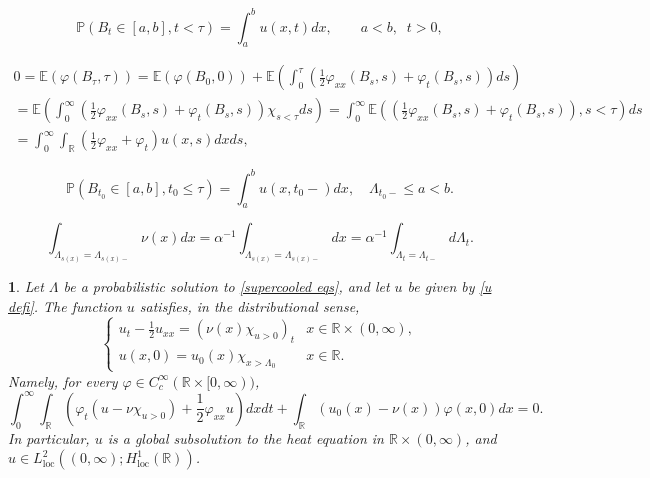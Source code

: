 \documentclass[10pt,a4paper]{amsart}
\newtheorem{prop}{}
\def\E{{\mathbb{E}}}
\def\P{{\mathbb{P}}}
\def\R{{\mathbb{R}}}
\begin{document}
\begin{equation} \label{u defi}    \P(B_t\in [a,b], t<\tau)=\int_{a}^bu(x,t)dx,\quad \quad a<b,\; \;t>0,
\end{equation}

\begin{multline}\label{qwodkr8}
    0=\E(\varphi(B_{\tau},\tau))= \E(\varphi(B_0,0))+\E\left( \int_{0}^\tau \left(\frac{1}{2}\varphi_{xx}(B_s,s)+\varphi_t(B_s,s)\right)ds\right)
    \\=\E\left( \int_{0}^{\infty} \left(\frac{1}{2}\varphi_{xx}(B_s,s)+\varphi_t(B_s,s)\right)\chi_{s<\tau}ds\right)= \int_{0}^{\infty}\E\left(  \left(\frac{1}{2}\varphi_{xx}(B_s,s)+\varphi_t(B_s,s)\right),s<\tau\right)ds\\=\int_{0}^{\infty}\int_{\R} \left( \frac{1}{2}\varphi_{xx}+\varphi_t\right)u(x,s)dxds,\end{multline}

\begin{equation} \label{u(t-) formula}
    \P(B_{t_0}\in [a,b], t_0\leq \tau) =\int_{a}^bu(x,t_0-)dx,  \quad \Lambda_{t_0-} \leq a <b.
\end{equation}

  \begin{equation} \label{cov nu231}
    \int_{\Lambda_{s(x)}=\Lambda_{s(x)-}}\nu(x)dx=\alpha^{-1}\int_{\Lambda_{s(x)}=\Lambda_{s(x)-}}dx=\alpha^{-1}\int_{\Lambda_{t}=\Lambda_{t-}}d\Lambda_t.
    \end{equation}

\begin{prop} \label{prop: u eq} Let $\Lambda$ be a probabilistic solution to \eqref{supercooled eqs}, and let $u$ be given by \eqref{u defi}. The function $u$ satisfies, in the distributional sense,
    \begin{equation}\label{u equation}\begin{cases} u_t-\frac12 u_{xx}=(\nu(x)\chi_{u>0})_t & x\in \R \times (0,\infty), \\
    u(x,0)=u_0(x) \chi_{x>\Lambda_0} &x\in \R.
    \end{cases}
\end{equation}
Namely, for every $\varphi\in C_c^{\infty}(\R \times [0,\infty))$,
\begin{equation}\label{u equation dist}
     \int_{0}^{\infty}\int_{\R} \left( \varphi_t(u-\nu \chi_{u>0})+\frac{1}{2}\varphi_{xx}u\right)dxdt+\int_{\R}(u_0(x)-\nu(x))\varphi(x,0)dx=0.
\end{equation}
In particular, $u$ is a global subsolution to the heat equation in $\R \times (0,\infty)$, and $u \in L^2_{\operatorname{loc}}((0,\infty);H^1_{\operatorname{loc}}(\R))$.
\end{prop}
\end{document}
